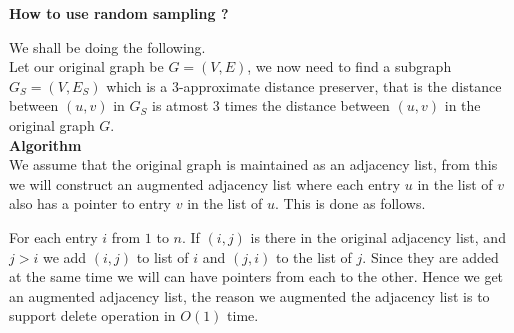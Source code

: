 \documentclass{assignment}
\date{September 26,2011}
\begin{document}
\begin{problemlist}
\pbitem
\begin{problem} 
\textbf{How to use random sampling ?} \\
\begin{answer}
We shall be doing the following. \\
Let our original graph be $G=(V,E)$, we now need to find a subgraph $G_S=(V,E_S)$ which is a 3-approximate distance preserver, that is the distance between $(u,v)$ in $G_S$ is atmost 3 times the distance between $(u,v)$ in the original graph $G$.  \\

\textbf{Algorithm} \\

We assume that the original graph is maintained as an adjacency list, from this we will construct an augmented adjacency list where each entry $u$ in the list of $v$ also has a pointer to entry $v$ in the list of $u$. This is done as follows. 

For each entry $i$ from $1$ to $n$. If $(i,j)$ is there in the original adjacency list, and $j>i$ we add $(i,j)$ to list of $i$ and $(j,i)$ to the list of $j$. Since they are added at the same time we will can have pointers from each to the other. Hence we get an augmented adjacency list, the reason we augmented the adjacency list is to support delete operation in $O(1)$ time. 


\end{answer}
\end{problem}
\end{problemlist}
\end{document}
